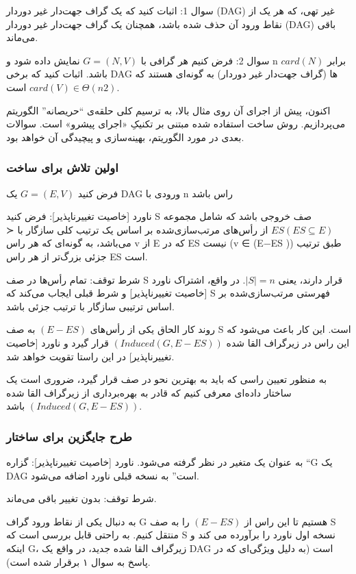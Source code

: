 \documentclass{book} %
\begin{document}
سوال 1: اثبات کنید که یک گراف جهت‌دار غیر دوردار (DAG) غیر تهی، که هر یک از نقاط ورود آن حذف
شده باشد، همچنان یک گراف جهت‌دار غیر دوردار (DAG) باقی می‌ماند.


سوال 2: فرض کنیم هر گرافی با $G = (N, V)$ نمایش داده شود و n برابر $card(N)$ باشد.
اثبات کنید که برخی DAG ها (گراف جهت‌دار غیر دوردار) به گونه‌ای هستند که $card(V) ∈ Θ(n2)$
است.

اکنون، پیش از اجرای آن روی مثال بالا، به ترسیم کلی حلقه‌ی “حریصانه” الگوریتم می‌پردازیم.
روش ساخت استفاده شده مبتنی بر تکنیکِ «اجرای پیشرو» است. سوالات بعدی در مورد
الگوریتم، بهینه‌سازی و پیچیدگی آن خواهد بود.

\newpage

\subsubsection*{اولین تلاش برای ساخت}
فرض کنید $G = (E, V)$ یک DAG ورودی با n راس باشد

ناورد [خاصیت تغییرناپذیر]: فرض کنید S صف خروجی باشد که شامل مجموعه $ES (ES ⊆ E)$ از رأس‌های مرتب‌سازی‌شده بر اساس یک ترتیب کلی سازگار با ≺  می‌باشد، به گونه‌ای که هر راس v از E که در ES نیست (v ∈ (E−ES )) طبق ترتیب جزئی بزرگ‌تر از هر راس ES است.

شرط توقف: تمام رأس‌ها در صف S قرار دارند، یعنی $|S| = n$.
در واقع، اشتراک ناورد [خاصیت تغییرناپذیر] و شرط قبلی ایجاب می‌کند که S
فهرستی مرتب‌سازی‌شده بر اساس ترتیبی سازگار با ترتیب جزئی باشد.

روند کار الحاق یکی از رأس‌های $(E − ES )$ به صف S است.
این کار باعث می‌شود که این راس در زیرگراف القا شده $(Induced(G, E − ES ))$ قرار گیرد
و ناورد [خاصیت تغییرناپذیر] در این راستا تقویت خواهد شد.

به منظور تعیین راسی که باید به بهترین نحو در صف قرار گیرد، ضروری است یک ساختار
داده‌ای معرفی کنیم که قادر به بهره‌برداری از زیرگراف القا شده $(Induced(G, E − ES ))$ باشد.

\subsubsection*{طرح جایگزین برای ساختار}
به عنوان یک متغیر در نظر گرفته می‌شود.
ناورد [خاصیت تغییرناپذیر]: گزاره “G یک DAG است” به نسخه قبلی ناورد اضافه می‌شود.

شرط توقف: بدون تغییر باقی می‌ماند.

به دنبال یکی از نقاط ورود گراف G هستیم تا این راس از $(E − ES )$ را به صف S منتقل کنیم.
به راحتی قابل بررسی است که S نسخه اول ناورد را برآورده می کند و اینکه G، زیرگراف القا
شده جدید، در واقع یک DAG است (به دلیل ویژگی‌ای که در پاسخ به سوال ۱ برقرار شده است).
\end{document}
